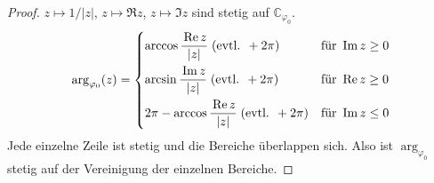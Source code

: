 \begin{theorem}[Hilfssatz]
  \begin{proof}
    $z \mapsto 1/|z|$, $z \mapsto \Re z$, $z \mapsto \Im z$ sind stetig auf $\mathbb{C}_{\varphi_0}$.
    \begin{align*}
      \arg_{\varphi_0} (z) =
      \begin{dcases}
        \arccos \frac{\Re z}{|z|} \; (\text{evtl. } + 2 \pi) & \text{für } \Im z \geq 0 \\
        \arcsin \frac{\Im z}{|z|} \; (\text{evtl. } + 2 \pi) & \text{für } \Re z \geq 0 \\
        2 \pi - \arccos \frac{\Re z}{|z|} \; (\text{evtl. } + 2 \pi) & \text{für } \Im z \leq 0
      \end{dcases}
    \end{align*}
    Jede einzelne Zeile ist stetig und die Bereiche überlappen sich. Also ist $\arg_{\varphi_0}$ stetig auf der Vereinigung der einzelnen Bereiche.
  \end{proof}
\end{theorem}

